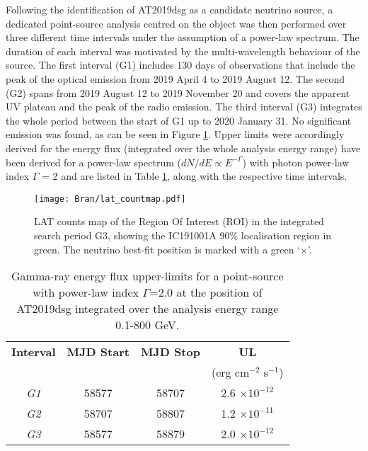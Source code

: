 Following the identification of AT2019dsg as a candidate neutrino source, a dedicated point-source analysis centred on the object was then performed over three different time intervals under the assumption of a power-law spectrum. The duration of each interval was motivated by the multi-wavelength behaviour of the source. The first interval (G1) includes 130 days of observations that include the peak of the optical emission from 2019 April 4 to 2019 August 12. The second (G2) spans from 2019 August 12 to 2019 November 20 and covers the apparent UV plateau and the peak of the radio emission. The third interval (G3) integrates the whole period between the start of G1 up to 2020 January 31. No significant emission was found, as can be seen in Figure \ref{fig:fermi}. Upper limits were accordingly derived for the energy flux (integrated over the whole analysis energy range) have been derived for a power-law spectrum ($dN/dE \propto E^{-\Gamma}$) with photon power-law index $\Gamma$ = 2 and are listed in Table \ref{tab:lat_uls}, along with the respective time intervals.

\begin{figure}
	\centering
	\texttt{[image: Bran/lat\_countmap.pdf]}
	\caption{LAT counts map of the Region Of Interest (ROI) in the integrated search period G3, showing the IC191001A 90$\%$ localisation region in green. The neutrino best-fit position is marked with a green `$\times$'. %
	}
	\label{fig:fermi}
\end{figure}

\begin{table}
	\centering
	\begin{tabular}{||c c c c||} 
		\hline
		\textbf{Interval} & \textbf{MJD Start} & \textbf{MJD Stop} & \textbf{UL}\\
		& & &  (erg cm$^{-2}$ s$^{-1}$)\\
		\hline
		\textit{G1} & 58577 & 58707 & 2.6 $\times 10^{-12}$\\
		\textit{G2} & 58707 & 58807 & 1.2 $\times 10^{-11}$\\
		\textit{G3} & 58577 & 58879 & 2.0 $\times 10^{-12}$\\
		\hline
	\end{tabular}
	\caption{Gamma-ray energy flux upper-limits for a point-source with power-law index $\Gamma$=2.0 at the position of AT2019dsg integrated over the analysis energy range 0.1-800 GeV.}
	\label{tab:lat_uls}
\end{table}


